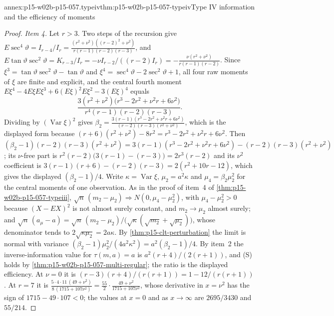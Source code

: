 \begin{annexitem}{annex:p15-w02b-p15-057.typeiv}{thm:p15-w02b-p15-057-typeiv}{Type IV information and the efficiency of moments}
\begin{proof}
\emph{Item 4.} Let \(r>3\). Two steps of the recursion give
\(E\sec^4\vartheta=I_{r-4}/I_r=\frac{(r^2+\nu^2)((r-2)^2+\nu^2)}
{r(r-1)(r-2)(r-3)}\), and
\(E\tan\vartheta\sec^2\vartheta=K_{r-3}/I_r=-\nu I_{r-2}/((r-2)I_r)
=-\frac{\nu(r^2+\nu^2)}{r(r-1)(r-2)}\). Since
\(\xi^3=\tan\vartheta\sec^2\vartheta-\tan\vartheta\) and
\(\xi^4=\sec^4\vartheta-2\sec^2\vartheta+1\), all four raw moments of
\(\xi\) are finite and explicit, and the central fourth moment
\(E\xi^4-4E\xi E\xi^3+6(E\xi)^2E\xi^2-3(E\xi)^4\) equals
\[
 \frac{3(r^2+\nu^2)\bigl(r^3-2r^2+\nu^2r+6\nu^2\bigr)}
 {r^4(r-1)(r-2)(r-3)} .
\]
Dividing by \((\operatorname{Var}\xi)^2\) gives
\(\beta_2=\frac{3(r-1)(r^3-2r^2+\nu^2r+6\nu^2)}{(r-2)(r-3)(r^2+\nu^2)}\),
which is the displayed form because
\((r+6)(r^2+\nu^2)-8r^2=r^3-2r^2+\nu^2r+6\nu^2\). Then
\((\beta_2-1)(r-2)(r-3)(r^2+\nu^2)
=3(r-1)(r^3-2r^2+\nu^2r+6\nu^2)-(r-2)(r-3)(r^2+\nu^2)\); its
\(\nu\)-free part is \(r^2(r-2)\bigl(3(r-1)-(r-3)\bigr)=2r^3(r-2)\) and its
\(\nu^2\) coefficient is \(3(r-1)(r+6)-(r-2)(r-3)=2(r^2+10r-12)\), which
gives the displayed \((\beta_2-1)/4\). Write
\(\kappa=\operatorname{Var}\xi\), \(\mu_2=a^2\kappa\) and
\(\mu_4=\beta_2\mu_2^2\) for the central moments of one observation. As
in the proof of item~4 of \cref{thm:p15-w02b-p15-057-typeiii},
\(\sqrt n\,(m_2-\mu_2)\Rightarrow N(0,\mu_4-\mu_2^2)\), with
\(\mu_4-\mu_2^2>0\) because \((X-EX)^2\) is not almost surely constant, and
\(m_2\to\mu_2\) almost surely; and
\(\sqrt n\,(a_\mu-a)=\sqrt n\,(m_2-\mu_2)/\bigl(\sqrt\kappa
(\sqrt{m_2}+\sqrt{\mu_2})\bigr)\), whose denominator tends to
\(2\sqrt{\kappa\mu_2}=2a\kappa\). By \cref{thm:p15-clt-perturbation} the
limit is normal with variance
\((\beta_2-1)\mu_2^2/(4a^2\kappa^2)=a^2(\beta_2-1)/4\). By item~2 the
inverse-information value for \(\tau(m,a)=a\) is \(a^2(r+4)/(2(r+1))\),
and (S) holds by \cref{thm:p15-w02b-p15-057-multi-regular}; the ratio is
the displayed efficiency. At \(\nu=0\) it is
\((r-3)(r+4)/(r(r+1))=1-12/(r(r+1))\). At \(r=7\) it is
\(\frac{5\cdot4\cdot11\,(49+\nu^2)}{8\,(1715+107\nu^2)}
=\frac{55}2\cdot\frac{49+\nu^2}{1715+107\nu^2}\), whose derivative in
\(x=\nu^2\) has the sign of \(1715-49\cdot107<0\); the values at
\(x=0\) and as \(x\to\infty\) are \(2695/3430\) and \(55/214\).
\end{proof}
\end{annexitem}

